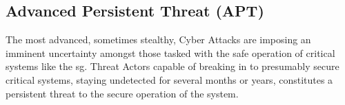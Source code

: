 \subsection{Advanced Persistent Threat (APT)}

The most advanced, sometimes stealthy, Cyber Attacks are imposing an imminent uncertainty amongst those tasked with the safe operation of critical systems like the \acrshort{sg}. Threat Actors capable of breaking in to presumably secure critical systems, staying undetected for several months or years, constitutes a persistent threat to the secure operation of the system.


